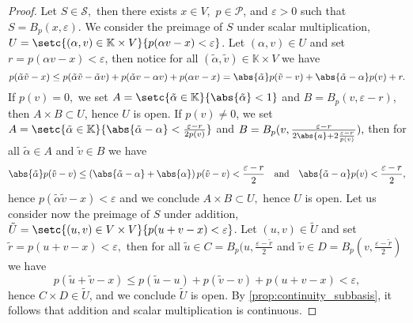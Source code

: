 \begin{proof}
    Let \(S \in \mathcal{S},\) then there exists \(x \in V,\) \(p \in \mathcal{P}\), and \(\varepsilon > 0\) such that \(S = B_p(x, \varepsilon)\). We consider the preimage of \(S\) under scalar multiplication, \(U = \setc{(\alpha, v) \in \mathbb{K} \times V}{p(\alpha v - x) < \varepsilon}\). Let \((\alpha, v) \in U\) and set \(r = p(\alpha v - x) < \varepsilon\), then notice for all \((\tilde{\alpha}, \tilde{v}) \in \mathbb{K} \times V\) we have
    \begin{equation*}
        p(\tilde{\alpha}\tilde{v} - x) \leq p(\tilde{\alpha}\tilde{v} - \tilde{\alpha} v) + p(\tilde{\alpha} v -  \alpha v) + p(\alpha v - x) = \abs{\tilde{\alpha}} p(\tilde{v} - v) + \abs{\tilde{\alpha} - \alpha} p(v) + r.
    \end{equation*}
    If \(p(v) = 0,\) we set \(A = \setc{\tilde{\alpha} \in \mathbb{K}}{\abs{\tilde{\alpha}} < 1}\) and \(B = B_p(v, \varepsilon - r)\), then \(A \times B \subset U\), hence \(U\) is open. If \(p(v) \neq 0\), we set \(A = \setc{\tilde{\alpha} \in \mathbb{K}}{\abs{\tilde{\alpha} - \alpha} < \frac{\varepsilon - r}{2p(v)}}\) and \(B = B_p(v, \frac{\varepsilon - r}{2\abs{a} + 2\frac{\varepsilon - r}{p(v)}}),\) then for all \(\tilde{\alpha} \in A\) and \(\tilde{v} \in B\) we have
    \begin{equation*}
        \abs{\tilde{\alpha}} p(\tilde{v} - v) \leq \left(\abs{\tilde{\alpha} - \alpha} + \abs{\alpha}\right) p(\tilde{v} - v) < \frac{\varepsilon - r}{2}
        \quad\text{and}\quad
        \abs{\tilde{\alpha} - \alpha} p(v) < \frac{\varepsilon - r}{2},
    \end{equation*}
    hence \(p(\tilde{\alpha} \tilde{v} - x) < \varepsilon\) and we conclude \(A \times B \subset U,\) hence \(U\) is open. Let us consider now the preimage of \(S\) under addition, \(\tilde{U} = \setc{(u,v) \in V\times V}{p(u + v - x) < \varepsilon}\). Let \((u,v) \in \tilde{U}\) and set \(\tilde{r} = p(u + v - x) < \varepsilon,\) then for all \(\tilde{u} \in C = B_p(u, \frac{\varepsilon - \tilde{r}}{2}\) and \(\tilde{v} \in D = B_p(v, \frac{\varepsilon - \tilde{r}}{2})\) we have
    \begin{equation*}
        p(\tilde{u} + \tilde{v} - x) \leq p(\tilde{u} - u) + p(\tilde{v} - v) + p(u + v - x) < \varepsilon,
    \end{equation*}
    hence \(C \times D \in \tilde{U}\), and we conclude \(\tilde{U}\) is open. By \cref{prop:continuity_subbasis}, it follows that addition and scalar multiplication is continuous.
\end{proof}
